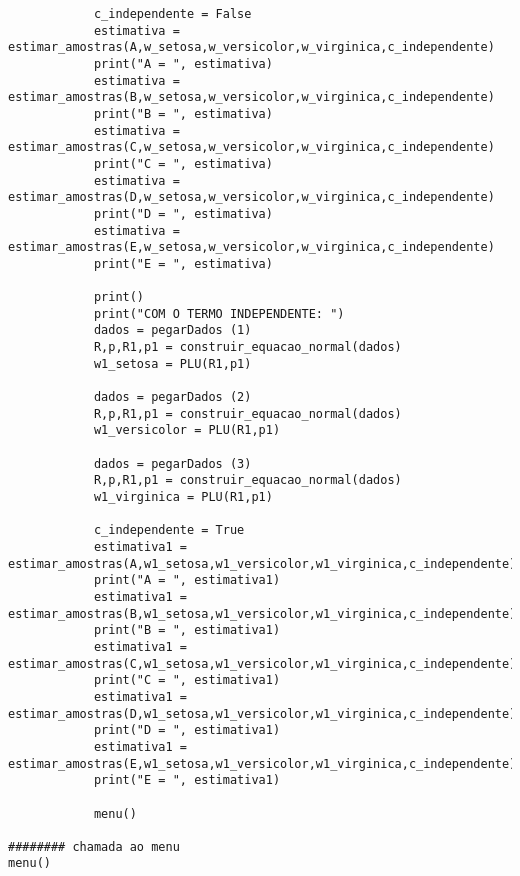 \documentclass[a4paper,12pt,twoside]{article}
\begin{document}
\begin{lstlisting}
            c_independente = False
            estimativa = estimar_amostras(A,w_setosa,w_versicolor,w_virginica,c_independente)
            print("A = ", estimativa)
            estimativa = estimar_amostras(B,w_setosa,w_versicolor,w_virginica,c_independente)
            print("B = ", estimativa)
            estimativa = estimar_amostras(C,w_setosa,w_versicolor,w_virginica,c_independente)
            print("C = ", estimativa)
            estimativa = estimar_amostras(D,w_setosa,w_versicolor,w_virginica,c_independente)
            print("D = ", estimativa)
            estimativa = estimar_amostras(E,w_setosa,w_versicolor,w_virginica,c_independente)
            print("E = ", estimativa)
            
            print()
            print("COM O TERMO INDEPENDENTE: ")
            dados = pegarDados (1)
            R,p,R1,p1 = construir_equacao_normal(dados)
            w1_setosa = PLU(R1,p1)
            
            dados = pegarDados (2)
            R,p,R1,p1 = construir_equacao_normal(dados)
            w1_versicolor = PLU(R1,p1)
            
            dados = pegarDados (3)
            R,p,R1,p1 = construir_equacao_normal(dados)
            w1_virginica = PLU(R1,p1)
            
            c_independente = True
            estimativa1 = estimar_amostras(A,w1_setosa,w1_versicolor,w1_virginica,c_independente)
            print("A = ", estimativa1)
            estimativa1 = estimar_amostras(B,w1_setosa,w1_versicolor,w1_virginica,c_independente)
            print("B = ", estimativa1)
            estimativa1 = estimar_amostras(C,w1_setosa,w1_versicolor,w1_virginica,c_independente)
            print("C = ", estimativa1)
            estimativa1 = estimar_amostras(D,w1_setosa,w1_versicolor,w1_virginica,c_independente)
            print("D = ", estimativa1)
            estimativa1 = estimar_amostras(E,w1_setosa,w1_versicolor,w1_virginica,c_independente)
            print("E = ", estimativa1)
            
            menu()
                       
######## chamada ao menu
menu()
\end{lstlisting}
\end{document}
